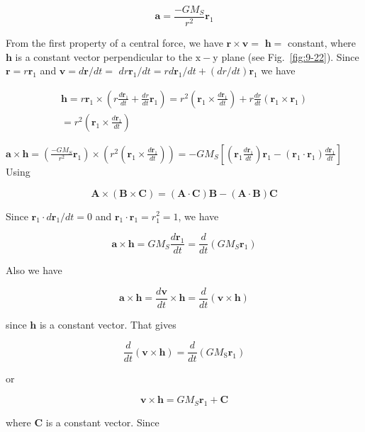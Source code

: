 \documentclass[10pt]{article}
\numberwithin{equation}{section}
\begin{document}
$$
\mathbf{a}=\frac{-G M_{S}}{r^{2}} \mathbf{r}_{1}
$$

From the first property of a central force, we have $\mathbf{r} \times \mathbf{v}=$ $\mathbf{h}=$ constant, where $\mathbf{h}$ is a constant vector perpendicular to the $\mathrm{x}-\mathrm{y}$ plane (see Fig.~\ref{fig:9-22}). Since $\mathbf{r}=r \mathbf{r}_{1}$ and $\mathbf{v}=d \mathbf{r} / d t=$ $d r \mathbf{r}_{1} / d t=r d \mathbf{r}_{1} / d t+(d r / d t) \mathbf{r}_{1}$ we have

$$
\begin{gathered}
\mathbf{h}=r \mathbf{r}_{1} \times\left(r \frac{d \mathbf{r}_{1}}{d t}+\frac{d r}{d t} \mathbf{r}_{1}\right)=r^{2}\left(\mathbf{r}_{1} \times \frac{d \mathbf{r}_{1}}{d t}\right)+r \frac{d r}{d t}\left(\mathbf{r}_{1} \times \mathbf{r}_{1}\right) \\
=r^{2}\left(\mathbf{r}_{1} \times \frac{d \mathbf{r}_{1}}{d t}\right)
\end{gathered}
$$

$\mathbf{a} \times \mathbf{h}=\left(\frac{-G M_{S}}{r^{2}} \mathbf{r}_{1}\right) \times\left(r^{2}\left(\mathbf{r}_{1} \times \frac{d \mathbf{r}_{1}}{d t}\right)\right)=-G M_{S}\left[\left(\mathbf{r}_{1} \frac{d \mathbf{r}_{1}}{d t}\right) \mathbf{r}_{1}-\left(\mathbf{r}_{1} \cdot \mathbf{r}_{1}\right) \frac{d \mathbf{r}_{1}}{d t}\right]$\\
Using

$$
\mathbf{A} \times(\mathbf{B} \times \mathbf{C})=(\mathbf{A} \cdot \mathbf{C}) \mathbf{B}-(\mathbf{A} \cdot \mathbf{B}) \mathbf{C}
$$

Since $\mathbf{r}_{1} \cdot d \mathbf{r}_{1} / d t=0$ and $\mathbf{r}_{1} \cdot \mathbf{r}_{1}=r_{1}^{2}=1$, we have

$$
\mathbf{a} \times \mathbf{h}=G M_{S} \frac{d \mathbf{r}_{1}}{d t}=\frac{d}{d t}\left(G M_{S} \mathbf{r}_{1}\right)
$$

Also we have

$$
\mathbf{a} \times \mathbf{h}=\frac{d \mathbf{v}}{d t} \times \mathbf{h}=\frac{d}{d t}(\mathbf{v} \times \mathbf{h})
$$

since $\mathbf{h}$ is a constant vector. That gives

$$
\frac{d}{d t}(\mathbf{v} \times \mathbf{h})=\frac{d}{d t}\left(G M_{\mathrm{S}} \mathbf{r}_{1}\right)
$$

or

$$
\mathbf{v} \times \mathbf{h}=G M_{S} \mathbf{r}_{1}+\mathbf{C}
$$

where $\mathbf{C}$ is a constant vector. Since
\end{document}
